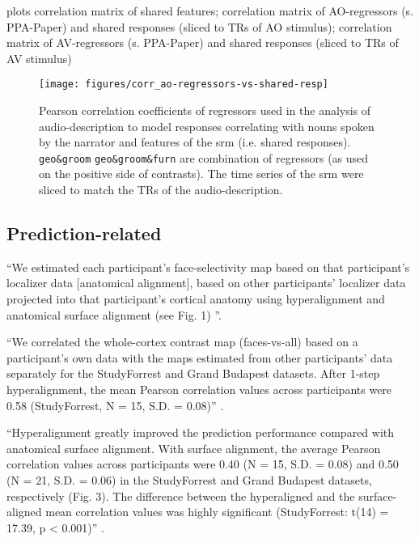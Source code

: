 plots correlation matrix of shared features; correlation matrix of
AO-regressors (s. PPA-Paper) and shared responses (sliced to TRs of AO
stimulus); correlation matrix of AV-regressors (s. PPA-Paper) and shared
responses (sliced to TRs of AV stimulus)




\begin{figure*}[tbp]
\centering
    \texttt{[image: figures/corr\_ao-regressors-vs-shared-resp]}
    \caption{Pearson correlation coefficients of regressors used in the analysis
    of audio-description to model responses correlating with nouns spoken by the
    narrator and features of the \ac{srm} (i.e. shared responses).
    \texttt{geo\&groom} \texttt{geo\&groom\&furn} are combination of regressors
    (as used on the positive side of contrasts). The
    time series of the \ac{srm} were sliced to match the TRs of the
    audio-description.
      }
\label{fig:reg-corr}
\end{figure*}


\subsection{Prediction-related}


``We estimated each participant's face-selectivity map based on that
participant’s localizer data [anatomical alignment], based on other
participants' localizer data projected into that participant's cortical anatomy
using hyperalignment and anatomical surface alignment (see Fig. 1)
\citep{jiahui2020predicting}''.

``We correlated the whole-cortex contrast map (faces-vs-all) based on a
participant’s own data with the maps estimated from other participants’ data
separately for the StudyForrest and Grand Budapest datasets. After 1-step
hyperalignment, the mean Pearson correlation values across participants were
0.58 (StudyForrest, N = 15, S.D. = 0.08)'' \citep{jiahui2020predicting}.

``Hyperalignment greatly improved the prediction performance compared with
anatomical surface alignment. With surface alignment, the average Pearson
correlation values across participants were 0.40 (N = 15, S.D. = 0.08) and 0.50
(N = 21, S.D. = 0.06) in the StudyForrest and Grand Budapest datasets,
respectively (Fig. 3). The difference between the hyperaligned and the
surface-aligned mean correlation values was highly significant (StudyForrest:
t(14) = 17.39, p < 0.001)'' \citep{jiahui2020predicting}.


